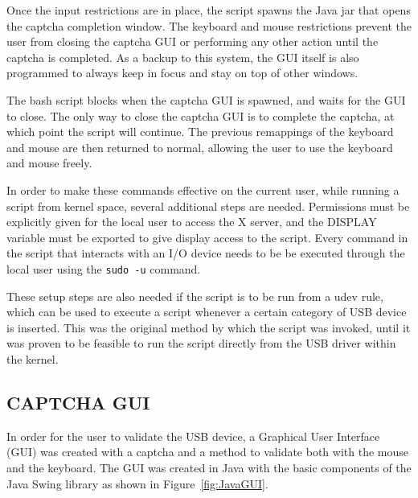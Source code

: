 \documentclass[pagenumbers]{ieee}
\begin{document}
Once the input restrictions are in place, the script spawns the Java jar that opens the captcha completion window. The keyboard and mouse restrictions prevent the user from closing the captcha GUI or performing any other action until the captcha is completed. As a backup to this system, the GUI itself is also programmed to always keep in focus and stay on top of other windows.

The bash script blocks when the captcha GUI is spawned, and waits for the GUI to close. The only way to close the captcha GUI is to complete the captcha, at which point the script will continue. The previous remappings of the keyboard and mouse are then returned to normal, allowing the user to use the keyboard and mouse freely.

In order to make these commands effective on the current user, while running a script from kernel space, several additional steps are needed. Permissions must be explicitly given for the local user to access the X server, and the DISPLAY variable must be exported to give display access to the script.  Every command in the script that interacts with an I/O device needs to be be executed through the local user using the \texttt{sudo -u} command. 

These setup steps are also needed if the script is to be run from a udev rule, which can be used to execute a script whenever a certain category of USB device is inserted. This was the original method by which the script was invoked, until it was proven to be feasible to run the script directly from the USB driver within the kernel.


\subsection{CAPTCHA GUI}
\label{section:gui}

In order for the user to validate the USB device, a Graphical User Interface (GUI) was created with a captcha and a method to validate both with the mouse and the keyboard. The GUI was created in Java with the basic components of the Java Swing \cite{kim} library as shown in Figure~\ref{fig:JavaGUI}.
\end{document}
